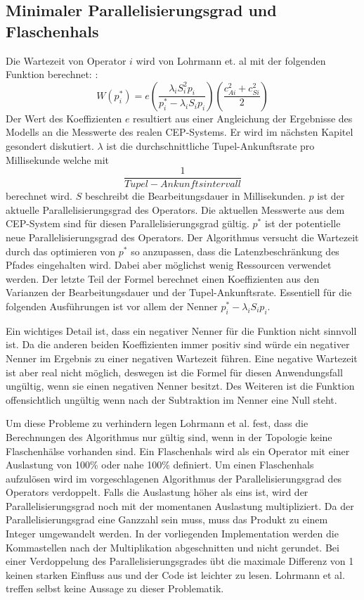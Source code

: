 \subsection{Minimaler Parallelisierungsgrad und Flaschenhals}
Die Wartezeit von Operator \(i\) wird von Lohrmann et. al mit der folgenden Funktion berechnet: \cite{lohrmann_elastic_2015}:
\[W(p_i^\ast) = e \left( \frac{\lambda_i {S}^{2}_{i} p_i}{p_i^\ast-\lambda_i {S}_i p_i}\right)\left(\frac{{c^{2}_{Ai}} + {c^{2}_{Si}}}{2}\right)\]
Der Wert des Koeffizienten \(e\) resultiert aus einer Angleichung der Ergebnisse des Modells an die Messwerte des realen CEP-Systems.
Er wird im nächsten Kapitel gesondert diskutiert.
\(\lambda\) ist die durchschnittliche Tupel-Ankunftsrate pro Millisekunde welche mit \[\frac{1}{Tupel-Ankunftsintervall}\] berechnet wird. 
\({S}\) beschreibt die Bearbeitungsdauer in Millisekunden.
\(p\) ist der aktuelle Parallelisierungsgrad des Operators.
Die aktuellen Messwerte aus dem CEP-System sind für diesen Parallelisierungsgrad gültig.
\(p^\ast\) ist der potentielle neue Parallelisierungsgrad des Operators.
Der Algorithmus versucht die Wartezeit durch das optimieren von \(p^\ast\) so anzupassen, dass die Latenzbeschränkung des Pfades eingehalten wird. Dabei aber möglichst wenig Ressourcen verwendet werden.
Der letzte Teil der Formel berechnet einen Koeffizienten aus den Varianzen der Bearbeitungsdauer und der Tupel-Ankunftsrate.
Essentiell für die folgenden Ausführungen ist vor allem der Nenner \(p_i^\ast-\lambda_i {S}_i p_i\).

Ein wichtiges Detail ist, dass ein negativer Nenner für die Funktion nicht sinnvoll ist.
Da die anderen beiden Koeffizienten immer positiv sind würde ein negativer Nenner im Ergebnis zu einer negativen Wartezeit führen.
Eine negative Wartezeit ist aber real nicht möglich, deswegen ist die Formel für diesen Anwendungsfall ungültig, wenn sie einen negativen Nenner besitzt.
Des Weiteren ist die Funktion offensichtlich ungültig wenn nach der Subtraktion im Nenner eine Null steht.

Um diese Probleme zu verhindern legen Lohrmann et al. fest, dass die Berechnungen des Algorithmus nur gültig sind, wenn in der Topologie keine Flaschenhälse vorhanden sind.
Ein Flaschenhals wird als ein Operator mit einer Auslastung von 100\% oder nahe 100\% definiert.
Um einen Flaschenhals aufzulösen wird im vorgeschlagenen Algorithmus der Parallelisierungsgrad des Operators verdoppelt. Falls die Auslastung höher als eins ist, wird der Parallelisierungsgrad noch mit der momentanen Auslastung multipliziert. Da der Parallelisierungsgrad eine Ganzzahl sein muss, muss das Produkt zu einem Integer umgewandelt werden. In der vorliegenden Implementation werden die Kommastellen nach der Multiplikation abgeschnitten und nicht gerundet. Bei einer Verdoppelung des Parallelisierungsgrades übt die maximale Differenz von 1 keinen starken Einfluss aus und der Code ist leichter zu lesen. Lohrmann et al. treffen selbst keine Aussage zu dieser Problematik.

